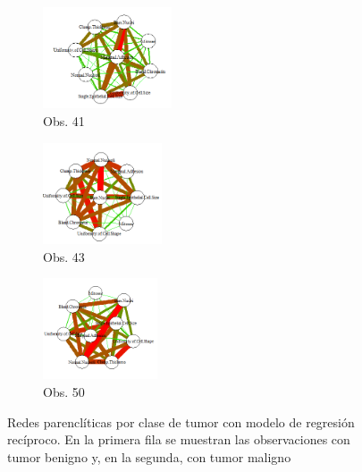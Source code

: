 \begin{figure}[htbp!]
\begin{center}
		\begin{subfigure}[t]{0.25\textwidth}
			\centering
			\includegraphics[height=3cm]{imagenes/cancer/m1_reciproco.png}
			\caption{Obs. 41}
		\end{subfigure}
		\begin{subfigure}[t]{0.25\textwidth}
			\centering
			\includegraphics[height=3cm]{imagenes/cancer/m2_reciproco.png}
			\caption{Obs. 43}
		\end{subfigure}
		\begin{subfigure}[t]{0.25\textwidth}
			\centering
			\includegraphics[height=3cm]{imagenes/cancer/m3_reciproco.png}
			\caption{Obs. 50}
		\end{subfigure}
	\end{center}
	\caption[Redes parenclíticas por clase de tumor con modelo de regresión recíproco]{Redes parenclíticas por clase de tumor con modelo de regresión recíproco. En la primera fila se muestran las observaciones con tumor benigno y, en la segunda, con tumor maligno}
	\label{fig:cancer_rec}
\end{figure}